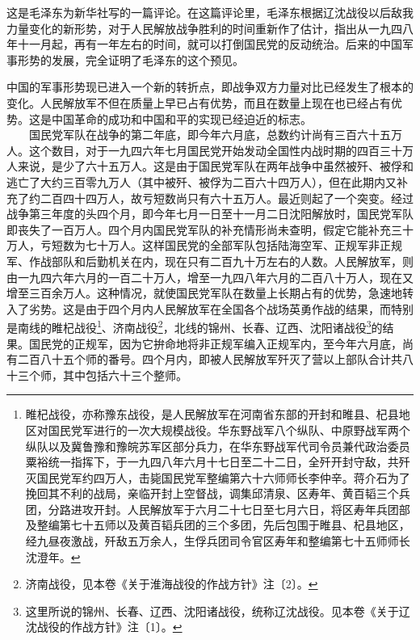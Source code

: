 \documentclass[cn,11pt,chinese]{elegantbook}
\begin{document}
\begin{introduction}\item  这是毛泽东为新华社写的一篇评论。在这篇评论里，毛泽东根据辽沈战役以后敌我力量变化的新形势，对于人民解放战争胜利的时间重新作了估计，指出从一九四八年十一月起，再有一年左右的时间，就可以打倒国民党的反动统治。后来的中国军事形势的发展，完全证明了毛泽东的这个预见。\end{introduction}
中国的军事形势现已进入一个新的转折点，即战争双方力量对比已经发生了根本的变化。人民解放军不但在质量上早已占有优势，而且在数量上现在也已经占有优势。这是中国革命的成功和中国和平的实现已经迫近的标志。\\
　　国民党军队在战争的第二年底，即今年六月底，总数约计尚有三百六十五万人。这个数目，对于一九四六年七月国民党开始发动全国性内战时期的四百三十万人来说，是少了六十五万人。这是由于国民党军队在两年战争中虽然被歼、被俘和逃亡了大约三百零九万人（其中被歼、被俘为二百六十四万人），但在此期内又补充了约二百四十四万人，故亏短数尚只有六十五万人。最近则起了一个突变。经过战争第三年度的头四个月，即今年七月一日至十一月二日沈阳解放时，国民党军队即丧失了一百万人。四个月内国民党军队的补充情形尚未查明，假定它能补充三十万人，亏短数为七十万人。这样国民党的全部军队包括陆海空军、正规军非正规军、作战部队和后勤机关在内，现在只有二百九十万左右的人数。人民解放军，则由一九四六年六月的一百二十万人，增至一九四八年六月的二百八十万人，现在又增至三百余万人。这种情况，就使国民党军队在数量上长期占有的优势，急速地转入了劣势。这是由于四个月内人民解放军在全国各个战场英勇作战的结果，而特别是南线的睢杞战役\footnote[1]{ 睢杞战役，亦称豫东战役，是人民解放军在河南省东部的开封和睢县、杞县地区对国民党军进行的一次大规模战役。华东野战军八个纵队、中原野战军两个纵队以及冀鲁豫和豫皖苏军区部分兵力，在华东野战军代司令员兼代政治委员粟裕统一指挥下，于一九四八年六月十七日至二十二日，全歼开封守敌，共歼灭国民党军约四万人，击毙国民党军整编第六十六师师长李仲辛。蒋介石为了挽回其不利的战局，亲临开封上空督战，调集邱清泉、区寿年、黄百韬三个兵团，分路进攻开封。人民解放军于六月二十七日至七月六日，将区寿年兵团部及整编第七十五师以及黄百韬兵团的三个多团，先后包围于睢县、杞县地区，经九昼夜激战，歼敌五万余人，生俘兵团司令官区寿年和整编第七十五师师长沈澄年。}、济南战役\footnote[2]{ 济南战役，见本卷《关于淮海战役的作战方针》注〔2〕。}，北线的锦州、长春、辽西、沈阳诸战役\footnote[3]{ 这里所说的锦州、长春、辽西、沈阳诸战役，统称辽沈战役。见本卷《关于辽沈战役的作战方针》注〔1〕。}的结果。国民党的正规军，因为它拚命地将非正规军编入正规军内，至今年六月底，尚有二百八十五个师的番号。四个月内，即被人民解放军歼灭了营以上部队合计共八十三个师，其中包括六十三个整师。\\
\end{document}
